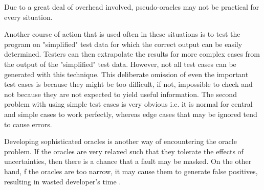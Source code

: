 Due to a great deal of overhead involved, pseudo-oracles may not be practical for every situation.  

Another course of action that is used often in these situations is to test the program on "simplified" test data for which the correct output can be easily determined. Testers can then extrapolate the results for more complex cases from the output of the "simplified" test data. However, not all test cases can be generated with this technique. This deliberate omission of even the important test cases is because they might be too difficult, if not, impossible to check and not because they are not expected to yield useful information. The second problem with using simple test cases is very obvious i.e. it is normal for central and simple cases to work perfectly, whereas edge cases that may be ignored tend to cause errors. \cite{Weyuker}

 Developing sophisticated oracles is another way of encountering the oracle problem. If the oracles are very relaxed such that they tolerate the effects of uncertainties, then there is a chance that a fault may be masked. On the other hand, f the oracles are too narrow, it may cause them to generate false positives, resulting in wasted developer's time \cite{Elbaum2014}.